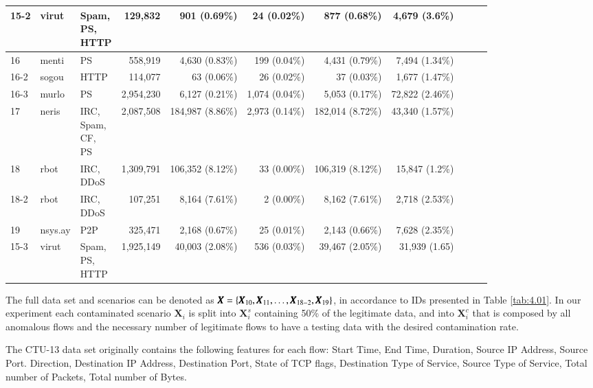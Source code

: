 \documentclass[review]{elsarticle}
\begin{document}
\begin{table}[h!]
\begin{tabular}{| l | l | l | r | r | r | r | r | r | r | r | }
			15-2 & virut &\makecell[l]{Spam,\\PS,\\HTTP} & 129,832 & 901 (0.69\%) & 24 (0.02\%) & 877 (0.68\%) &4,679 (3.6\%)\\ \hline
			16 & menti &PS & 558,919 & 4,630 (0.83\%) & 199 (0.04\%) & 4,431 (0.79\%) &7,494 (1.34\%)\\ \hline
			16-2 & sogou &HTTP & 114,077 & 63 (0.06\%) & 26 (0.02\%) & 37 (0.03\%) &1,677 (1.47\%)\\ \hline
			16-3 & murlo &PS & 2,954,230 & 6,127 (0.21\%) & 1,074 (0.04\%) & 5,053 (0.17\%) &72,822 (2.46\%)\\ \hline
			17 & neris &\makecell[l]{IRC,\\Spam,\\CF,\\PS} & 2,087,508 & 184,987 (8.86\%) & 2,973 (0.14\%) & 182,014 (8.72\%) &43,340 (1.57\%)\\ \hline
			18 & rbot &\makecell[l]{IRC,\\DDoS} & 1,309,791 & 106,352 (8.12\%) & 33 (0.00\%) & 106,319 (8.12\%) &15,847 (1.2\%)\\ \hline
			18-2 & rbot &\makecell[l]{IRC,\\DDoS} & 107,251 & 8,164 (7.61\%) & 2 (0.00\%) & 8,162 (7.61\%) &2,718 (2.53\%)\\ \hline
			19 & nsys.ay &P2P & 325,471 & 2,168 (0.67\%) & 25 (0.01\%) & 2,143 (0.66\%) &7,628 (2.35\%)\\ \hline
			15-3 & virut &\makecell[l]{Spam,\\PS,\\HTTP} & 1,925,149 & 40,003 (2.08\%) & 536 (0.03\%) & 39,467 (2.05\%) &31,939 (1.65)\\ \hline
	\end{tabular}
\end{table}

The full data set and scenarios can be denoted as $\pmb{X} = \{\pmb{X}_{10}, \pmb{X}_{11}, \ldots , \pmb{X}_{18-2},\\ \pmb{X}_{19}\}$, in accordance to IDs presented in Table \ref{tab:4.01}. In our experiment each contaminated scenario $\pmb{X}_i$ is split into $\pmb{X}_i^s$ containing 50\% of the legitimate data, and into $\pmb{X}_i^c$ that is composed by all anomalous flows and the necessary number of legitimate flows to have a testing data with the desired contamination rate.

The CTU-13 data set originally contains the following features for each flow: Start Time, End Time, Duration, Source IP Address, Source Port. Direction, Destination IP Address, Destination Port, State of TCP flags, Destination Type of Service, Source Type of Service, Total number of Packets, Total number of Bytes.
\end{document}
